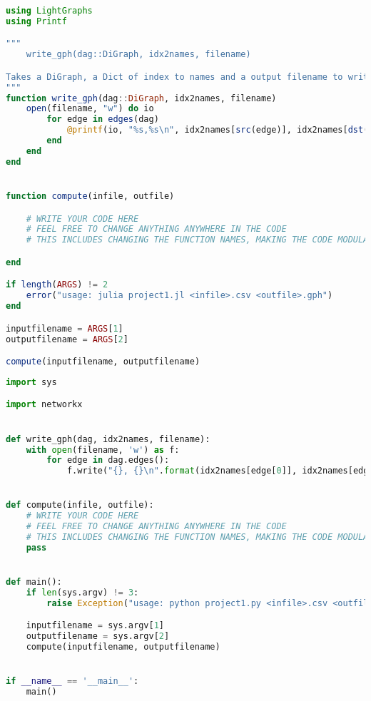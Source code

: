 \documentclass[twoside,11pt]{article}
\begin{document}
\begin{algorithm}
\begin{lstlisting}[language=Julia]
using LightGraphs
using Printf

"""
    write_gph(dag::DiGraph, idx2names, filename)

Takes a DiGraph, a Dict of index to names and a output filename to write the graph in `gph` format.
"""
function write_gph(dag::DiGraph, idx2names, filename)
    open(filename, "w") do io
        for edge in edges(dag)
            @printf(io, "%s,%s\n", idx2names[src(edge)], idx2names[dst(edge)])
        end
    end
end


function compute(infile, outfile)

    # WRITE YOUR CODE HERE
    # FEEL FREE TO CHANGE ANYTHING ANYWHERE IN THE CODE
    # THIS INCLUDES CHANGING THE FUNCTION NAMES, MAKING THE CODE MODULAR, BASICALLY ANYTHING

end

if length(ARGS) != 2
    error("usage: julia project1.jl <infile>.csv <outfile>.gph")
end

inputfilename = ARGS[1]
outputfilename = ARGS[2]

compute(inputfilename, outputfilename)
\end{lstlisting}
\end{algorithm}


\begin{algorithm}
\begin{lstlisting}[language=Python]
import sys

import networkx


def write_gph(dag, idx2names, filename):
    with open(filename, 'w') as f:
        for edge in dag.edges():
            f.write("{}, {}\n".format(idx2names[edge[0]], idx2names[edge[1]]))


def compute(infile, outfile):
    # WRITE YOUR CODE HERE
    # FEEL FREE TO CHANGE ANYTHING ANYWHERE IN THE CODE
    # THIS INCLUDES CHANGING THE FUNCTION NAMES, MAKING THE CODE MODULAR, BASICALLY ANYTHING
    pass


def main():
    if len(sys.argv) != 3:
        raise Exception("usage: python project1.py <infile>.csv <outfile>.gph")

    inputfilename = sys.argv[1]
    outputfilename = sys.argv[2]
    compute(inputfilename, outputfilename)


if __name__ == '__main__':
    main()

\end{lstlisting}
\end{algorithm}
\end{document}

